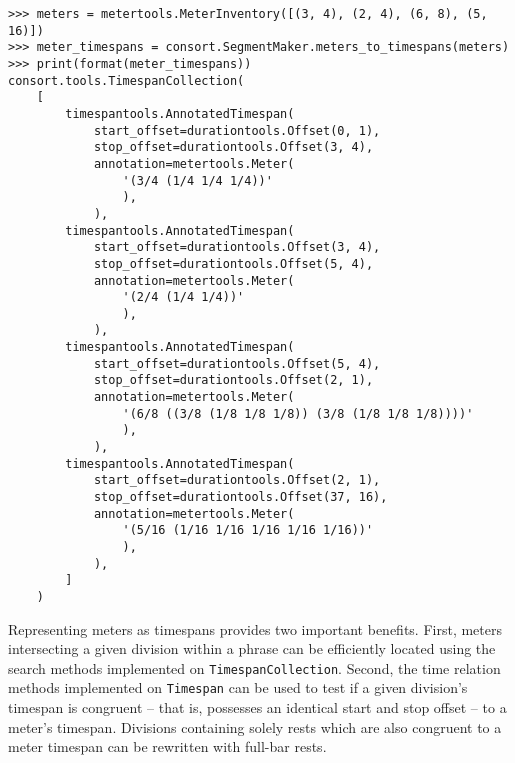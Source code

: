 \begin{abjadbookoutput}
\begin{singlespacing}
\vspace{-0.5\baselineskip}
\begin{lstlisting}
>>> meters = metertools.MeterInventory([(3, 4), (2, 4), (6, 8), (5, 16)])
>>> meter_timespans = consort.SegmentMaker.meters_to_timespans(meters)
>>> print(format(meter_timespans))
consort.tools.TimespanCollection(
    [
        timespantools.AnnotatedTimespan(
            start_offset=durationtools.Offset(0, 1),
            stop_offset=durationtools.Offset(3, 4),
            annotation=metertools.Meter(
                '(3/4 (1/4 1/4 1/4))'
                ),
            ),
        timespantools.AnnotatedTimespan(
            start_offset=durationtools.Offset(3, 4),
            stop_offset=durationtools.Offset(5, 4),
            annotation=metertools.Meter(
                '(2/4 (1/4 1/4))'
                ),
            ),
        timespantools.AnnotatedTimespan(
            start_offset=durationtools.Offset(5, 4),
            stop_offset=durationtools.Offset(2, 1),
            annotation=metertools.Meter(
                '(6/8 ((3/8 (1/8 1/8 1/8)) (3/8 (1/8 1/8 1/8))))'
                ),
            ),
        timespantools.AnnotatedTimespan(
            start_offset=durationtools.Offset(2, 1),
            stop_offset=durationtools.Offset(37, 16),
            annotation=metertools.Meter(
                '(5/16 (1/16 1/16 1/16 1/16 1/16))'
                ),
            ),
        ]
    )
\end{lstlisting}
\end{singlespacing}
\end{abjadbookoutput}

\noindent Representing meters as timespans provides two important benefits.
First, meters intersecting a given division within a phrase can be efficiently
located using the search methods implemented on \texttt{TimespanCollection}.
Second, the time relation methods implemented on \texttt{Timespan} can be used
to test if a given division's timespan is congruent -- that is, possesses an
identical start and stop offset -- to a meter's timespan. Divisions containing
solely rests which are also congruent to a meter timespan can be rewritten with
full-bar rests.

